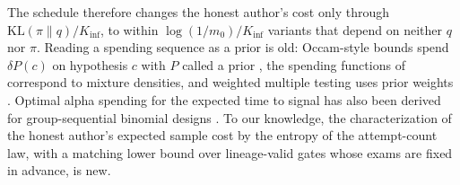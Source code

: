 The schedule therefore changes the honest author's cost only through $\mathrm{KL}(\pi\|q)/K_{\inf}$, to within $\log(1/m_0)/K_{\inf}$ variants that depend on neither $q$ nor $\pi$. Reading a spending sequence as a prior is old: Occam-style bounds spend $\delta P(c)$ on hypothesis $c$ with $P$ called a prior \citep[Theorem~4.1]{langford2005tutorial}, the spending functions of \citet{howard2021timeuniform} correspond to mixture densities, and weighted multiple testing uses prior weights \citep{genovese2006weighting,roeder2009genome}. Optimal alpha spending for the expected time to signal has also been derived for group-sequential binomial designs \citep{silva2020optimal}. To our knowledge, the characterization of the honest author's expected sample cost by the entropy of the attempt-count law, with a matching lower bound over lineage-valid gates whose exams are fixed in advance, is new.

